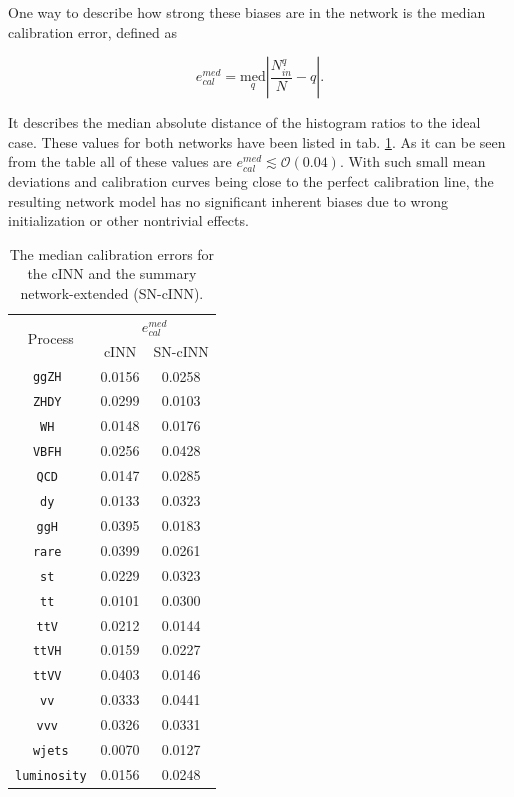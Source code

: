 One way to describe how strong these biases are in the network is the median calibration error, defined as

\begin{equation*}
	e^{med}_{cal} = \underset{q}{\text{med}} \left|\frac{N^q_{in}}{N} - q\right|.
\end{equation*}

It describes the median absolute distance of the histogram ratios to the ideal case. These values for both networks have been listed in tab. \ref{tab:ecal_med}. As it can be seen from the table all of these values are $e^{med}_{cal}\lesssim\mathcal{O}(0.04)$. With such small mean deviations and calibration curves being close to the perfect calibration line, the resulting network model has no significant inherent biases due to wrong initialization or other nontrivial effects.

\begin{table}[h!]
	\centering
	\begin{tabular}{ccc}
		\multirow{2}{*}{Process}& \multicolumn{2}{c}{$e^{med}_{cal}$} \\
		 & cINN & SN-cINN \\
		\hline
		\texttt{ggZH }   & 0.0156    &    0.0258  \\
		\texttt{ZHDY }   & 0.0299    &    0.0103  \\
		\texttt{WH   }   & 0.0148    &    0.0176  \\
		\texttt{VBFH }   & 0.0256    &    0.0428  \\
		\texttt{QCD  }   & 0.0147    &    0.0285  \\
		\texttt{dy   }   & 0.0133    &    0.0323  \\
		\texttt{ggH  }   & 0.0395    &    0.0183  \\
		\texttt{rare }   & 0.0399    &    0.0261  \\
		\texttt{st   }   & 0.0229    &    0.0323  \\
		\texttt{tt   }   & 0.0101    &    0.0300  \\
		\texttt{ttV  }   & 0.0212    &    0.0144  \\
		\texttt{ttVH }   & 0.0159    &    0.0227  \\
		\texttt{ttVV }   & 0.0403    &    0.0146  \\
		\texttt{vv   }   & 0.0333    &    0.0441  \\
		\texttt{vvv  }   & 0.0326    &    0.0331  \\
		\texttt{wjets}   & 0.0070    &    0.0127  \\
		\texttt{luminosity}   & 0.0156    &    0.0248  \\
		\hline
	\end{tabular}
	\caption{The median calibration errors for the cINN and the summary network-extended (SN-cINN).}
	\label{tab:ecal_med}
\end{table}

